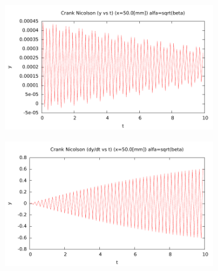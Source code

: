 \begin{center}
\begin{figure} [H]
	\begin{subfigure}[b]{0.3\textwidth}
		\includegraphics{./parte3/graficos/grafico_cn_S2_y_b1.pdf}
		\caption{} 
		\label{fig:cnS2b1_y}
	\end{subfigure}
	
	\begin{subfigure}[b]{0.3\textwidth}
		\includegraphics{./parte3/graficos/grafico_cn_S2_dy_b1.pdf}
		\caption{} 
		\label{fig:cnS2b1_dy}
	\end{subfigure}
\end{figure}
\end{center}

